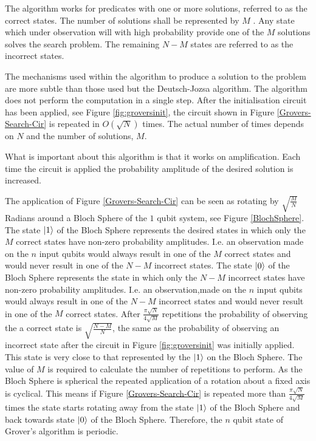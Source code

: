 The algorithm works for predicates with one or more solutions, referred to as the correct states.
The number of solutions shall be represented by $M$ .
Any state which under observation will with high probability provide one of the $M$ solutions solves the search problem.
The remaining $N-M$ states are referred to as the incorrect states.

The mechanisms used within the algorithm to produce a solution to the problem are more subtle than those used but the Deutsch-Jozsa algorithm.
The algorithm does not perform the computation in a single step.
After the initialisation circuit has been applied, see Figure \ref{fig:groversinit}, the circuit shown in Figure \ref{Grovers-Search-Cir} is repeated in $O(\sqrt{N})$ times.
The actual number of times depends on $N$ and the number of solutions, $M$.

What is important about this algorithm is that it works on amplification.
Each time the circuit is applied the probability amplitude of the desired solution is increased.

The application of Figure \ref{Grovers-Search-Cir} can be seen as rotating by $\sqrt{\frac{M}{N}}$ Radians around a Bloch Sphere of the $1$ qubit system, see Figure \ref{BlochSphere}.
The state $\left\vert{1}\right\rangle$ of the Bloch Sphere represents the desired states in which only the $M$ correct states have non-zero probability amplitudes.
I.e. an observation made on the $n$ input qubits would always result in one of the $M$ correct states and would never result in one of the $N-M$ incorrect states.
The state $\left\vert{0}\right\rangle$ of the Bloch Sphere represents the state in which only the $N-M$ incorrect states have non-zero probability amplitudes.
I.e. an observation,made on the $n$ input qubits would always result in one of the $N-M$ incorrect states and would never result in one of the $M$ correct states.
After $\frac{\pi\sqrt{N}}{4\sqrt{M}}$ repetitions the probability of observing the a correct state is $\sqrt{\frac{N-M}{N}}$, the same as the probability of observing an incorrect state after the circuit in Figure \ref{fig:groversinit} was initially applied.
This state is very close to that represented by the $\left\vert{1}\right\rangle$ on the Bloch Sphere.
The value of $M$ is required to calculate the number of repetitions to perform.
As the Bloch Sphere is spherical the repeated application of a rotation about a fixed axis is cyclical.
This means if Figure \ref{Grovers-Search-Cir} is repeated more than $\frac{\pi\sqrt{N}}{4\sqrt{M}}$ times the state starts rotating away from the state $\left\vert{1}\right\rangle$ of the Bloch Sphere and back towards state $\left\vert{0}\right\rangle$ of the Bloch Sphere.
Therefore, the $n$ qubit state of Grover's algorithm is periodic.

